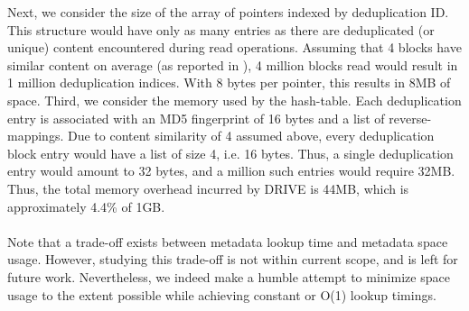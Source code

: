Next, we consider the size of the array of pointers indexed by deduplication
ID.
This structure would have only as many entries as there are
deduplicated (or unique) content encountered during read operations.
Assuming that 4 blocks have similar content on average (as reported
in \cite{iodedup}), 4 million blocks read would result in 1 million
deduplication indices. With 8 bytes per pointer, this results in 8MB of space.
Third, we consider the memory used by the hash-table.
Each deduplication entry is associated with an MD5
fingerprint of 16 bytes and a list of reverse-mappings.
Due to content similarity of 4 assumed
above, every deduplication block entry would have a list of size 4, i.e.
16 bytes. Thus, a single deduplication entry would amount to 32 bytes,
and a million such entries would require 32MB.
Thus, the total memory overhead incurred by DRIVE is
44MB, which is approximately 4.4\% of 1GB.
\\
\\
Note that a trade-off exists between metadata lookup time and metadata
space usage.
However, studying this trade-off is not within
current scope, and is left for future work. Nevertheless, we indeed
make a humble attempt to minimize space usage to the extent possible
while achieving constant or O(1) lookup timings.


